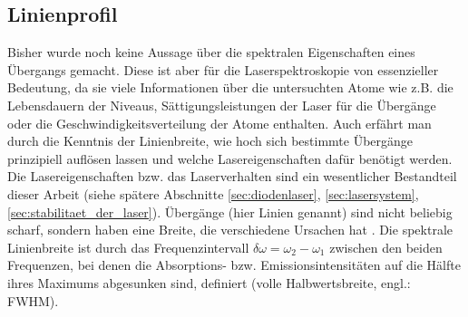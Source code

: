 \subsection{Linienprofil}\label{sec:linienprofil}
Bisher wurde noch keine Aussage über die spektralen Eigenschaften eines
Übergangs gemacht. Diese ist aber für die Laserspektroskopie von essenzieller
Bedeutung, da sie viele Informationen über die untersuchten Atome wie z.B. die
Lebensdauern der Niveaus, Sättigungsleistungen der Laser für die Übergänge oder
die Geschwindigkeitsverteilung der Atome enthalten. Auch erfährt man durch die
Kenntnis der Linienbreite, wie hoch sich bestimmte Übergänge prinzipiell
auflösen lassen und welche Lasereigenschaften dafür benötigt werden. Die
Lasereigenschaften bzw. das Laserverhalten sind ein wesentlicher Bestandteil
dieser Arbeit (siehe spätere Abschnitte \ref{sec:diodenlaser},
\ref{sec:lasersystem}, \ref{sec:stabilitaet_der_laser}). Übergänge (hier Linien genannt) sind nicht beliebig scharf, sondern
haben eine Breite, die verschiedene Ursachen hat
\cite{demtroeder:laserspektroskopie}. Die spektrale Linienbreite ist durch das Frequenzintervall $\delta\omega=\omega_2-\omega_1$ zwischen den beiden
Frequenzen, bei denen die Absorptions- bzw. Emissionsintensitäten auf die Hälfte
ihres Maximums abgesunken sind, definiert (volle Halbwertsbreite, engl.:
FWHM).

